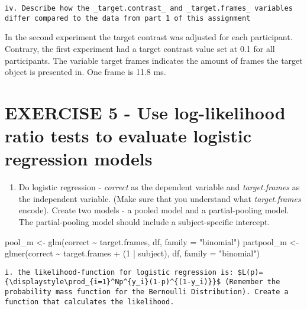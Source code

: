 \documentclass[
]{article}
\newenvironment{Shaded}{\begin{snugshade}}{\end{snugshade}}
\newcommand{\AttributeTok}[1]{\textcolor[rgb]{0.77,0.63,0.00}{#1}}
\newcommand{\DecValTok}[1]{\textcolor[rgb]{0.00,0.00,0.81}{#1}}
\newcommand{\FunctionTok}[1]{\textcolor[rgb]{0.00,0.00,0.00}{#1}}
\newcommand{\NormalTok}[1]{#1}
\newcommand{\OtherTok}[1]{\textcolor[rgb]{0.56,0.35,0.01}{#1}}
\newcommand{\SpecialCharTok}[1]{\textcolor[rgb]{0.00,0.00,0.00}{#1}}
\newcommand{\StringTok}[1]{\textcolor[rgb]{0.31,0.60,0.02}{#1}}
\providecommand{\tightlist}{%
  \setlength{\itemsep}{0pt}\setlength{\parskip}{0pt}}
\begin{document}
\begin{verbatim}
iv. Describe how the _target.contrast_ and _target.frames_ variables differ compared to the data from part 1 of this assignment  
\end{verbatim}

In the second experiment the target contrast was adjusted for each
participant. Contrary, the first experiment had a target contrast value
set at 0.1 for all participants. The variable target frames indicates
the amount of frames the target object is presented in. One frame is
11.8 ms.

\hypertarget{exercise-5---use-log-likelihood-ratio-tests-to-evaluate-logistic-regression-models}{%
\section{EXERCISE 5 - Use log-likelihood ratio tests to evaluate
logistic regression
models}\label{exercise-5---use-log-likelihood-ratio-tests-to-evaluate-logistic-regression-models}}

\begin{enumerate}
\def\labelenumi{\arabic{enumi})}
\tightlist
\item
  Do logistic regression - \emph{correct} as the dependent variable and
  \emph{target.frames} as the independent variable. (Make sure that you
  understand what \emph{target.frames} encode). Create two models - a
  pooled model and a partial-pooling model. The partial-pooling model
  should include a subject-specific intercept.
\end{enumerate}

\begin{Shaded}
\begin{Highlighting}[]
\NormalTok{pool\_m }\OtherTok{\textless{}{-}} \FunctionTok{glm}\NormalTok{(correct }\SpecialCharTok{\textasciitilde{}}\NormalTok{ target.frames, df, }\AttributeTok{family =} \StringTok{"binomial"}\NormalTok{)}
\NormalTok{partpool\_m }\OtherTok{\textless{}{-}} \FunctionTok{glmer}\NormalTok{(correct }\SpecialCharTok{\textasciitilde{}}\NormalTok{ target.frames }\SpecialCharTok{+}\NormalTok{ (}\DecValTok{1} \SpecialCharTok{|}\NormalTok{ subject), df, }\AttributeTok{family =} \StringTok{"binomial"}\NormalTok{)}
\end{Highlighting}
\end{Shaded}

\begin{verbatim}
i. the likelihood-function for logistic regression is: $L(p)={\displaystyle\prod_{i=1}^Np^{y_i}(1-p)^{(1-y_i)}}$ (Remember the probability mass function for the Bernoulli Distribution). Create a function that calculates the likelihood. 
\end{verbatim}
\end{document}
